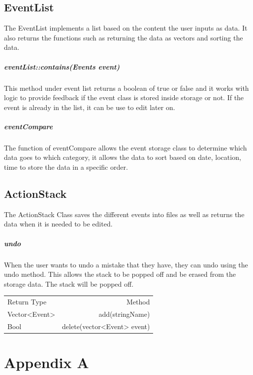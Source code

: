 \documentclass[12pt]{extarticle}
\begin{document}
\subsection{EventList}
The EventList implements a list based on the content the user inputs as data. It also returns the functions such as returning the data as vectors and sorting the data.
\subparagraph{eventList::contains(Events event)}
This method under event list returns a boolean of true or false and it works with logic to provide feedback if the event class is stored inside storage or not. If the event is already in the list, it can be use to edit later on.
\subparagraph{eventCompare}
The function of eventCompare allows the event storage class to determine which data goes to which category, it allows the data to sort based on date, location, time to store the data in a specific order.
\subsection{ActionStack}
The ActionStack Class saves the different events into files as well as returns the data when it is needed to be edited.
\subparagraph{undo}
When the user wants to undo a mistake that they have, they can undo using the undo method. This allows the stack to be popped off and be erased from the storage data. The stack will be popped off.


\begin{center}
\begin{tabular}{|l|r|}
Return Type                     & Method                                         \\
Vector<Event>                   & add(stringName)                                \\
Bool                            & delete(vector<Event> event)
\end{tabular}
\end{center}

\section{Appendix A}
\end{document}
